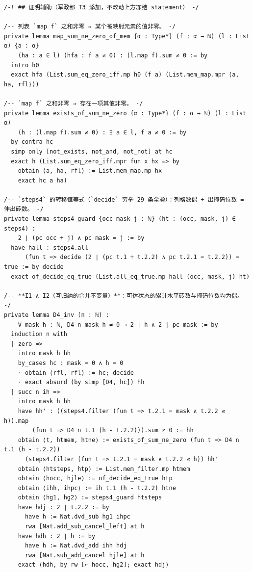 \documentclass[11pt]{article}
\begin{document}
\begin{lstlisting}[caption={Verbatim excerpt, lines 86--183 of \texttt{final/03-half4-proved.lean} (183 lines, sha256 \texttt{548f3ef5}...); the full text is in the deposit's \texttt{proofs/}.},label={lst:proof}]
/-! ## 证明辅助（军政部 T3 添加，不改动上方冻结 statement） -/

/-- 列表 `map f` 之和非零 ⇒ 某个被映射元素的值非零。 -/
private lemma map_sum_ne_zero_of_mem {α : Type*} (f : α → ℕ) (l : List α) {a : α}
    (ha : a ∈ l) (hfa : f a ≠ 0) : (l.map f).sum ≠ 0 := by
  intro h0
  exact hfa (List.sum_eq_zero_iff.mp h0 (f a) (List.mem_map.mpr ⟨a, ha, rfl⟩))

/-- `map f` 之和非零 ⇒ 存在一项其值非零。 -/
private lemma exists_of_sum_ne_zero {α : Type*} (f : α → ℕ) (l : List α)
    (h : (l.map f).sum ≠ 0) : ∃ a ∈ l, f a ≠ 0 := by
  by_contra hc
  simp only [not_exists, not_and, not_not] at hc
  exact h (List.sum_eq_zero_iff.mpr fun x hx => by
    obtain ⟨a, ha, rfl⟩ := List.mem_map.mp hx
    exact hc a ha)

/-- `steps4` 的转移恒等式（`decide` 穷举 29 条全验）：列格数偶 + 出掩码位数 = 伸出砖数。 -/
private lemma steps4_guard {occ mask j : ℕ} (ht : (occ, mask, j) ∈ steps4) :
    2 ∣ (pc occ + j) ∧ pc mask = j := by
  have hall : steps4.all
      (fun t => decide (2 ∣ (pc t.1 + t.2.2) ∧ pc t.2.1 = t.2.2)) = true := by decide
  exact of_decide_eq_true (List.all_eq_true.mp hall (occ, mask, j) ht)

/-- **I1 ∧ I2（互归纳的合并不变量）**：可达状态的累计水平砖数与掩码位数均为偶。 -/
private lemma D4_inv (n : ℕ) :
    ∀ mask h : ℕ, D4 n mask h ≠ 0 → 2 ∣ h ∧ 2 ∣ pc mask := by
  induction n with
  | zero =>
    intro mask h hh
    by_cases hc : mask = 0 ∧ h = 0
    · obtain ⟨rfl, rfl⟩ := hc; decide
    · exact absurd (by simp [D4, hc]) hh
  | succ n ih =>
    intro mask h hh
    have hh' : ((steps4.filter (fun t => t.2.1 = mask ∧ t.2.2 ≤ h)).map
        (fun t => D4 n t.1 (h - t.2.2))).sum ≠ 0 := hh
    obtain ⟨t, htmem, htne⟩ := exists_of_sum_ne_zero (fun t => D4 n t.1 (h - t.2.2))
      (steps4.filter (fun t => t.2.1 = mask ∧ t.2.2 ≤ h)) hh'
    obtain ⟨htsteps, htp⟩ := List.mem_filter.mp htmem
    obtain ⟨hocc, hjle⟩ := of_decide_eq_true htp
    obtain ⟨ihh, ihpc⟩ := ih t.1 (h - t.2.2) htne
    obtain ⟨hg1, hg2⟩ := steps4_guard htsteps
    have hdj : 2 ∣ t.2.2 := by
      have h := Nat.dvd_sub hg1 ihpc
      rwa [Nat.add_sub_cancel_left] at h
    have hdh : 2 ∣ h := by
      have h := Nat.dvd_add ihh hdj
      rwa [Nat.sub_add_cancel hjle] at h
    exact ⟨hdh, by rw [← hocc, hg2]; exact hdj⟩


\end{lstlisting}
\end{document}
